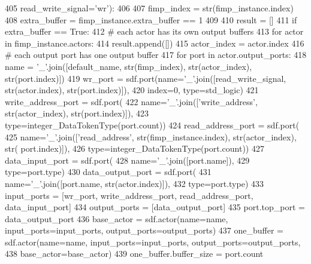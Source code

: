 \begin{DoxyCode}
405                   read\_write\_signal=\textcolor{stringliteral}{'wr'}):
406 
407     fimp\_index = str(fimp\_instance.index)
408     extra\_buffer = fimp\_instance.extra\_buffer == 1
409 
410     result = []
411     \textcolor{keywordflow}{if} extra\_buffer == \textcolor{keyword}{True}:
412         \textcolor{comment}{# each actor has its own output buffers}
413         \textcolor{keywordflow}{for} actor \textcolor{keywordflow}{in} fimp\_instance.actors:
414             result.append([])
415             actor\_index = actor.index
416             \textcolor{comment}{# each output port has one output buffer}
417             \textcolor{keywordflow}{for} port \textcolor{keywordflow}{in} actor.output\_ports:
418                 name = \textcolor{stringliteral}{'\_'}.join([default\_name, str(fimp\_index), str(actor\_index), str(port.index)])
419                 wr\_port = sdf.port(name=\textcolor{stringliteral}{'\_'}.join([read\_write\_signal, str(actor.index), str(port.index)]),
420                                    index=0, type=std\_logic)
421                 write\_address\_port = sdf.port(
422                     name=\textcolor{stringliteral}{'\_'}.join([\textcolor{stringliteral}{'write\_address'}, str(actor\_index), str(port.index)]),
423                     type=integer\_DataTokenType(port.count))
424                 read\_address\_port = sdf.port(
425                     name=\textcolor{stringliteral}{'\_'}.join([\textcolor{stringliteral}{'read\_address'}, str(fimp\_instance.index), str(actor\_index), str(
      port.index)]),
426                     type=integer\_DataTokenType(port.count))
427                 data\_input\_port = sdf.port(
428                     name=\textcolor{stringliteral}{'\_'}.join([port.name]),
429                     type=port.type)
430                 data\_output\_port = sdf.port(
431                     name=\textcolor{stringliteral}{'\_'}.join([port.name, str(actor.index)]),
432                     type=port.type)
433                 input\_ports = [wr\_port, write\_address\_port, read\_address\_port, data\_input\_port]
434                 output\_ports = [data\_output\_port]
435                 port.top\_port = data\_output\_port
436                 base\_actor = sdf.actor(name=name, input\_ports=input\_ports, output\_ports=output\_ports)
437                 one\_buffer = sdf.actor(name=name, input\_ports=input\_ports, output\_ports=output\_ports,
438                                        base\_actor=base\_actor)
439                 one\_buffer.buffer\_size = port.count

\end{DoxyCode}
